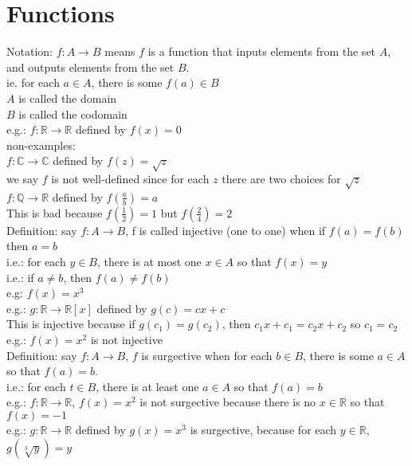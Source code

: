 \documentclass[11pt]{article}
\begin{document}
\doublespacing
\section{Functions}

Notation: $f: A\rightarrow B$ means $f$ is a function that inputs elements from the set $A$, and outputs elements from the set $B$.\\
ie. for each $a\in A$, there is some $f(a)\in B$\\
$A$ is called the domain\\
$B$ is called the codomain\\
e.g.: $f: \mathbb{R} \rightarrow \mathbb{R}$ defined by $f(x)=0$\\
non-examples:\\
$f: \mathbb{C}\rightarrow\mathbb{C}$ defined by $f(z)=\sqrt{z}$\\
we say $f$ is not well-defined since for each $z$ there are two choices for $\sqrt{{z}}$\\
$f: \mathbb{Q}\rightarrow\mathbb{R}$ defined by $f(\frac{a}{b})=a$\\
This is bad because $f(\frac{1}{2})=1$ but $f(\frac{2}{4})=2$\\

Definition: say $f: A\rightarrow B$, f is called injective (one to one) when if $f(a)=f(b)$ then $a=b$\\
i.e.: for each $y\in B$, there is at most one $x\in A$ so that $f(x)=y$\\
i.e.: if $a\neq b$, then $f(a)\neq f(b)$\\
e.g: $f(x)=x^3$\\
e.g.: $g: \mathbb{R}\rightarrow\mathbb{R}[x]$ defined by $g(c)=cx+c$\\
This is injective because if $g(c_1)=g(c_2)$, then $c_1x+c_1=c_2x+c_2$ so $c_1=c_2$\\
e.g.: $f(x)=x^2$ is not injective\\

Definition: say $f: A\rightarrow B$, $f$ is surgective when for each $b\in B$, there is some $a\in A$ so that $f(a)=b$.\\
i.e.: for each $t\in B$, there is at least one $a\in A$ so that $f(a)=b$\\
e.g.: $f: \mathbb{R}\rightarrow\mathbb{R}$, $f(x)=x^2$ is not surgective because there is no $x\in \mathbb{R}$ so that $f(x)=-1$\\
e.g.: $g: \mathbb{R}\rightarrow\mathbb{R}$ defined by $g(x)=x^3$ is surgective, because for each $y\in\mathbb{R}$, $g(\sqrt[3]{y})=y$\\
\end{document}
